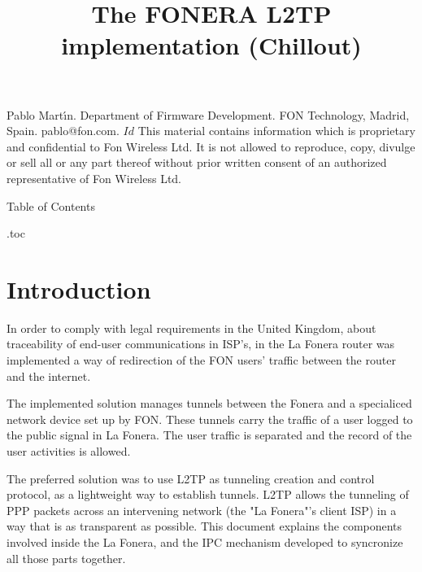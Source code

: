 \title{The FONERA L2TP implementation (Chillout)}
\header Pablo Mart\'\i{}n.  Department of Firmware Development.  FON
Technology, Madrid, Spain.  pablo@fon.com.
\begintt $Id$
\endtt
{\disclaimerfont
This material contains information which is proprietary and confidential to
Fon Wireless Ltd. It is not allowed to reproduce, copy, divulge or sell all
or any part thereof without prior written consent of an authorized
representative of Fon Wireless Ltd.}
\bigskip
\centerline{\sectfont Table of Contents}
 \jobname.toc
\bigskip
\section{Introduction}

In order to comply with legal requirements in the United Kingdom, about
traceability of end-user communications in ISP's, in the La Fonera router
was implemented a way of redirection of the FON users' traffic between the
router and the internet.

The implemented solution manages tunnels between the Fonera and a 
specialiced network device set up by FON. These tunnels carry the
traffic of a user logged to the public signal in La Fonera. The user
traffic is separated and the record of the user activities is
allowed.

The preferred solution was to use L2TP as tunneling creation and control
protocol, as a lightweight way to establish tunnels. L2TP allows the
tunneling of PPP packets across an intervening network (the "La Fonera"'s
client ISP) in a way that is as transparent as possible. This document
explains the components involved inside the La Fonera, and the IPC mechanism
developed to syncronize all those parts together.
